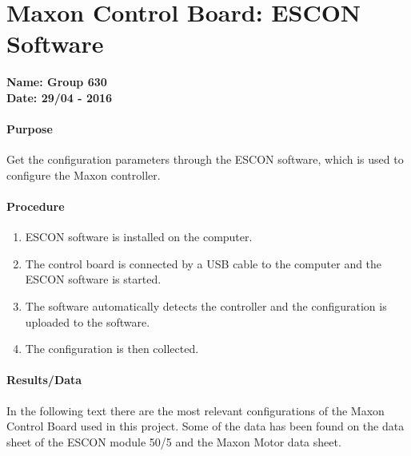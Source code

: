 \chapter{Maxon Control Board: ESCON Software}\label{MaxonControlESCON} 
\textbf{Name: Group 630}\\
\textbf{Date: 29/04 - 2016}

\subsubsection{Purpose}
Get the configuration parameters through the ESCON software, which is used to configure the Maxon controller.  

\subsubsection{Procedure}
\begin{enumerate}
  \item ESCON software is installed on the computer.
  \item The control board is connected by a USB cable to the computer and the ESCON software is started.
  \item The software automatically detects the controller and the configuration is uploaded to the software.
  \item The configuration is then collected.
\end{enumerate}

\subsubsection{Results/Data}
In the following text there are the most relevant configurations of the Maxon Control Board used in this project. Some of the data has been found on the data sheet of the ESCON module 50/5 and the Maxon Motor data sheet.


